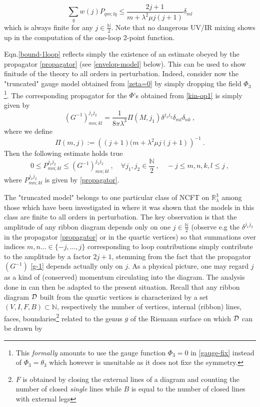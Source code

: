 \documentclass[a4paper,11pt,twoside]{article}
\numberwithin{equation}{section}
\theoremstyle{nonumberplain}
\newcounter{and}
\begin{document}
%
\begin{equation}
\sum_q w(j) P_{qm;lq} \le \frac{2j+1}{m+\lambda^2\mu j(j+1)} \delta_{ml} \label{bound-1loop}
\end{equation}
%
which is always finite for any $j\in\frac{\mathbb{N}}{2}$. Note that no dangerous UV/IR mixing shows up in the computation of the one-loop 2-point function.\par %
%
Eqn.\eqref{bound-1loop} reflects simply the existence of an estimate obeyed by the propagator \eqref{propagator} (see \eqref{envelop-model} below). This can be used to show finitude of the theory to all orders in perturbation. Indeed, consider now the "truncated" gauge model obtained from \eqref{zeta=0} by simply dropping the field $\Phi_3${\footnote{This {\it{formally}} amounts to use the gauge function $\Phi_3=0$ in \eqref{gauge-fix} instead of $\Phi_3=\theta_3$ which however is unsuitable as it does not fixe the symmetry.}}. The corresponding propagator for the $\Phi$'s obtained from \eqref{kin-op1} is simply given by%
%
\begin{equation} 
(G^{-1})^{j_1j_2}_{mn;kl} = \frac{1}{8\pi\lambda^3} \Pi(M,j_1) \delta^{j_1j_2}\delta_{ml}\delta_{nk} \ , \label{g-1}
\end{equation}
%
where we define%
%
\begin{equation}
\Pi(m,j) := \left((j+1)(m+\lambda^2\mu j(j+1)\right)^{-1} \ . \label{Pi}
\end{equation}
%
Then the following estimate holds true%
%
\begin{equation}
0\le P^{j_1j_2}_{mn;kl}\le(G^{-1})^{j_1j_2}_{mn;kl} \ , \quad \forall j_1,j_2\in\frac{\mathbb{N}}{2}\ , \quad -j\le m,n,k,l\le j \ ,\label{envelop-model}
\end{equation}
where $P^{j_1j_2}_{mn;kl}$ is given by \eqref{propagator}. \par%
%
The "truncated model" belongs to one particular class of NCFT on $\mathbb{R}^3_\lambda$ among those which have been investigated in \cite{vit-wal-12} where it was shown that the models in this class are finite to all orders in perturbation. The key observation is that the amplitude of any ribbon diagram depends only on one $j\in\frac{\mathbb{N}}{2}$ (observe e.g the $\delta^{j_1j_2}$ in the propagator \eqref{propagator} or in the quartic vertices) so that summations over indices $m,n...\in\{-j,...,j\}$ corresponding to loop contributions simply contribute to the amplitude by a factor $2j+1$, stemming from the fact that the propagator $(G^{-1})$ \eqref{g-1} depends actually only on $j$. As a physical picture, one may regard $j$ as a kind of (conserved) momentum circulating into the diagram. The analysis done in \cite{vit-wal-12} can then be adapted to the present situation. Recall that any ribbon diagram ${\cal{D}}$ built from the quartic vertices is characterized by a set $(V,I,F,B)\subset\mathbb{N}$, respectively the number of vertices, internal (ribbon) lines, faces, boundaries{\footnote{$F$ is obtained by closing the external lines of a diagram and counting the number of closed {\it{single}} lines while $B$ is equal to the number of closed lines with external legs}} related to the genus $g$ of the Riemann surface on which ${\cal{D}}$ can be drawn by%
\end{document}
